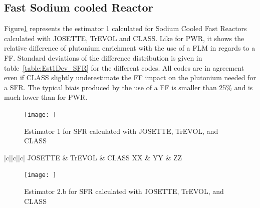 \subsection{Fast Sodium cooled Reactor}

Figure\ref{fig:Est1_SFR} represents the estimator 1 calculated for Sodium Cooled Fast Reactors calculated with JOSETTE, TrEVOL and CLASS. Like for PWR, it shows the relative difference of plutonium enrichment with the use of a FLM in regards to a FF. Standard deviations of the difference distribution is given in table~\ref{table:Est1Dev_SFR} for the different codes. 
All codes are in agreement even if CLASS slightly underestimate the FF impact on the plutonium needed for a SFR. The typical biais produced by the use of a FF is smaller than 25\% and is much lower than for PWR.  

\begin{figure}[h]
	\begin{center}
		\texttt{[image: ]}
		\caption{Estimator 1 for SFR calculated with JOSETTE, TrEVOL, and CLASS}
		\label{fig:Est1_SFR}
	\end{center}
\end{figure}

\begin{table}[h]
	\begin{center}
		\begin{tabular}{|c||c||c|}
			\hline 
				JOSETTE & TrEVOL & CLASS
			\hline
				XX & YY & ZZ 
		\end{tabular}
	\end{center}
	\label{table:Est1Dev_SFR}
\end{table}

\begin{figure}[h]
	\begin{center}
		\texttt{[image: ]}
		\caption{Estimator 2.b for SFR calculated with JOSETTE, TrEVOL, and CLASS}
		\label{fig:Est2_SFR}
	\end{center}
\end{figure}
